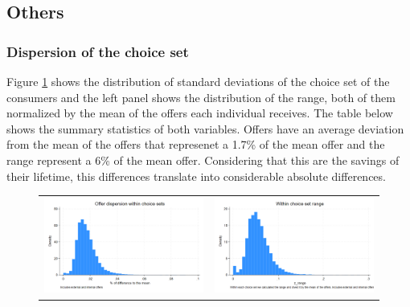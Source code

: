 \documentclass[12pt]{article}
\begin{document}
\subsection{Others}

\subsubsection{Dispersion of the choice set}
Figure \ref{fig:ie3_5} shows the distribution of standard deviations of the choice set of the consumers and the left panel shows the distribution of the range, both of them normalized by the mean of the offers each individual receives.  The table below shows the summary statistics of both variables. Offers have an average deviation from the mean of the offers that represenet a 1.7\% of the mean offer and the range represent a 6\% of the mean offer. Considering that this are the savings of their lifetime, this differences translate into considerable absolute differences.

\begin{figure}[H] 
\caption{}
\label{fig:ie3_5}
\centering{}%
\begin{tabular}{cc}
\includegraphics[scale=0.26]{../figures/IE3_dispertion_choice_set.png} & \includegraphics[scale=0.26]{../figures/IE3_dispertion_choice_set_range.png}
\end{tabular}
\end{figure}
\end{document}

